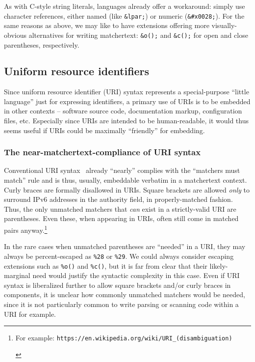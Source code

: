 As with C-style string literals,
\ml languages already offer a workaround:
simply use character references,
either named (like \verb|&lpar;|)
or numeric (\verb|&#x0028;|).
For the same reasons as above,
we may like to have extensions
offering more visually-obvious alternatives for writing matchertext:
\eg \verb|&o();| and \verb|&c();|
for open and close parentheses, 
respectively.


\subsection{Uniform resource identifiers}
\label{sec:embed:uri}

Since uniform resource identifier (URI) syntax represents
a special-purpose ``little language'' just for expressing identifiers,
a primary use of URIs is to be embedded in other contexts --
software source code, documentation markup, configuration files, etc.
Especially since URIs are intended to be human-readable,
it would thus seems useful if URIs
could be maximally ``friendly'' for embedding.

\subsubsection{The near-matchertext-compliance of URI syntax}

Conventional URI syntax~\cite{rfc3986}
already ``nearly'' complies with the ``matchers must match'' rule
and is thus, usually, embeddable verbatim in a matchertext context.
Curly braces are formally disallowed in URIs.
Square brackets are allowed \emph{only} to surround IPv6 addresses
in the authority field,
in properly-matched fashion.
Thus, the only unmatched matchers that \emph{can} exist
in a strictly-valid URI are parentheses.
Even these, when appearing in URIs,
often still come in matched pairs anyway.\footnote{\begin{tiny}
	For example:
	\texttt{https://en.wikipedia.org/wiki/URI\_(disambiguation)}
	\end{tiny}}

In the rare cases when unmatched parentheses are ``needed'' in a URI,
they may always be percent-escaped as \verb|%28| or \verb|%29|.
We could always consider escaping extensions
such as \verb|%o()| and \verb|%c()|,
but it is far from clear that their likely-marginal need
would justify the syntactic complexity in this case.
Even if URI syntax is liberalized further to allow
square brackets and/or curly braces in components,
it is unclear how commonly unmatched matchers would be needed,
since it is not particularly common to write parsing or scanning code
within a URI for example.


